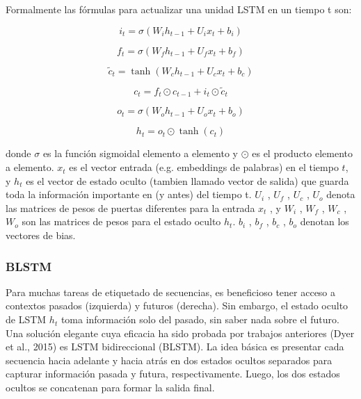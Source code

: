 \documentclass[runningheads]{llncs}
\begin{document}
\newpage

Formalmente las fórmulas para actualizar una unidad LSTM en un tiempo t son:

\begin{equation}
i_{t} = \sigma(W_{i} h_{t-1} + U_{i} x_{t} + b_{i})
\end{equation}

\begin{equation}
f_{t} = \sigma(W_{f} h_{t-1} + U_{f} x_{t} + b_{f})
\end{equation}

\begin{equation}
\tilde{c}_{t} = \tanh(W_{c} h_{t-1} + U_{c} x_{t} + b_{c})
\end{equation}

\begin{equation}
c_{t} = f_{t} \odot c_{t-1} + i_{t} \odot \tilde{c}_{t}
\end{equation}

\begin{equation}
o_t = \sigma(W_{o} h_{t-1} + U_{o} x_{t} + b_{o})
\end{equation}

\begin{equation}
h_{t} = o_{t} \odot \tanh( c_{t})
\end{equation}



donde $\sigma$ es la función sigmoidal elemento a elemento y $\odot$ es el producto elemento a elemento. 
$x_{t}$ es el  vector entrada (e.g. embeddings de palabras) en el tiempo $t$, y $h_{t}$ es el 
vector de estado oculto (tambien llamado vector de salida) que guarda toda la información importante 
en (y antes) del tiempo  t. $U_{i}$ , $U_{f}$ , $U_{c}$ , $U_{o}$ denota las matrices de pesos de 
puertas diferentes para la entrada $x_{t}$ , y $W_{i}$ , $W_{f}$ , $ W_{c}$ , $W_{o}$ son las
matrices de pesos para el estado oculto $h_{t}$. $b_{i}$ , $b_{f}$ , $b_{c}$ , $b_{o}$ denotan los 
vectores de bias.

\subsubsection{BLSTM}

Para muchas tareas de etiquetado de secuencias, es beneficioso tener acceso a contextos pasados 
(izquierda) y futuros (derecha). Sin embargo, el estado oculto de LSTM $h_{t}$ toma información 
solo del pasado, sin saber nada sobre el futuro. Una solución elegante cuya eficacia ha sido probada 
por trabajos anteriores (Dyer et al., 2015) es LSTM bidireccional (BLSTM). La idea básica es presentar 
cada secuencia hacia adelante y hacia atrás en dos estados ocultos separados para capturar información 
pasada y futura, respectivamente. Luego, los dos estados ocultos se concatenan para formar la salida 
final.
\end{document}
